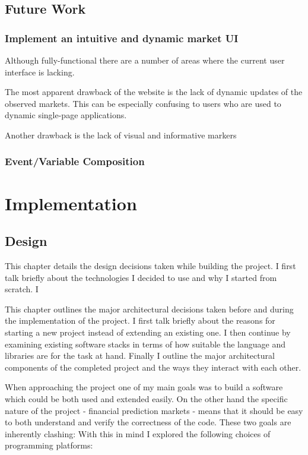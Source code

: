 \documentclass[bsc,frontabs,twoside,singlespacing,parskip,deptreport]{infthesis}     %
\begin{document}
\section{Future Work}

\subsection{Implement an intuitive and dynamic market UI}
	Although fully-functional there are a number of areas where the current user interface is lacking. 
	
	The most apparent drawback of the website is the lack of dynamic updates of the observed markets. This can be especially confusing to users who are used to dynamic single-page applications. 
	
	Another drawback is the lack of visual and informative markers

\subsection{Event/Variable Composition}

\chapter{Implementation}

\section{Design}
	This chapter details the design decisions taken while building the project. I first talk briefly about the technologies I decided to use and why I started from scratch. I 

	This chapter outlines the major architectural decisions taken before and during the implementation of the project. I first talk briefly about the reasons for starting a new project instead of extending an existing one. I then continue by examining existing software stacks in terms of how suitable the language and libraries are for the task at hand. Finally I outline the major architectural components of the completed project and the ways they interact with each other. 

	When approaching the project one of my main goals was to build a software which could be both used and extended easily. On the other hand the specific nature of the project - financial prediction markets - means that it should be easy to both understand and verify the correctness of the code. These two goals are inherently clashing: 
With this in mind I explored the following choices of programming platforms:
\end{document}
